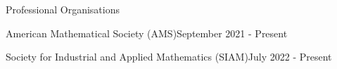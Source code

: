 \begin{rSection}{Professional Organisations}

\begin{rSubsectionSmall}{American Mathematical Society (AMS)}{September 2021 - Present}
\end{rSubsectionSmall}

\smallskip

\begin{rSubsectionSmall}{Society for Industrial and Applied Mathematics (SIAM)}{July 2022 - Present}
\end{rSubsectionSmall}

\end{rSection}